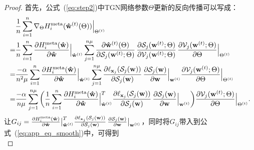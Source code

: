 \begin{proof}
首先，公式~(\ref{eq:step2})中TGN网络参数$\Theta$更新的反向传播可以写成：
\begin{equation}
\begin{aligned}
\label{eq:app_eq_smooth}
     &   \frac{1}{n} \sum\limits_{i=1}^{n} \nabla_{\Theta} H_i^{\rm meta}(\mathbf{\hat w}^{(t)}(\Theta)) \Big{|}_{\Theta^{(t)}} \\
     = & \frac{1}{n} \sum\limits_{i=1}^{n} \frac{\partial H_i^{\rm meta}(\mathbf{\hat w})}{\partial {\mathbf{\hat  w}}} \Big{|}_{\mathbf{\hat  w}^{(t)}} \sum\limits_{j=1}^{n\mu}
     \frac{\partial \mathbf{\hat w}^{(t)}(\Theta)}
            {\partial \mathcal{S}_j(\mathbf{w}^{(t)}; \Theta)} \,
     \frac{\partial \mathcal{S}_j(\mathbf{w}^{(t)}; \Theta)}
            {\partial \mathcal{V}_j(\mathbf{w}^{(t)}; \Theta)} \,
     \frac{\partial \mathcal{V}_j(\mathbf{w}^{(t)}; \Theta)}{\partial \Theta} \Big{|}_{\Theta^{(t)}} \\
     = & \frac{-\alpha}{n^2\mu} \sum\limits_{i=1}^{n} \frac{\partial H_i^{\rm meta}(\mathbf{\hat w})}{\partial {\mathbf{\hat  w}}} \Big{|}_{\mathbf{\hat  w}^{(t)}}  \sum\limits_{j=1}^{n\mu} \frac{\partial \ell_{\mathbf{x}_j}(\mathcal{S}_j(\mathbf{w}))}{\partial \mathcal{S}_j(\mathbf{w})} \, \frac{\partial \mathcal{S}_j(\mathbf{w})}{\partial \mathbf{w}}
     \Big{|}_{\mathbf{w}^{(t)}}
     \frac{\partial \mathcal{V}_j(\mathbf{w}^{(t)}; \Theta)}{\partial \Theta} \Big{|}_{\Theta^{(t)}} \\
     = & \frac{- \alpha}{n\mu} \sum\limits_{j=1}^{n\mu} 
     \bigg{(}
     \frac{1}{n} \sum\limits_{i=1}^{n} \frac{\partial H_i^{\rm meta}(\mathbf{\hat w})}{\partial {\mathbf{\hat  w}}} \Big{|}_{\mathbf{\hat  w}^{(t)}}^T \frac{\partial \ell_{\mathbf{x}_j}(\mathcal{S}_j(\mathbf{w}))}{\partial \mathcal{S}_j(\mathbf{w})} \, \frac{\partial \mathcal{S}_j(\mathbf{w})}{\partial \mathbf{w}} \Big{|}_{\mathbf{w}^{(t)}}
     \bigg{)} \frac{\partial \mathcal{V}_j(\mathbf{w}^{(t)}; \Theta)}{\partial \Theta} \Big{|}_{\Theta^{(t)}}.
\end{aligned}
\end{equation}
让$G_{ij} = \frac{\partial H_i^{\rm meta}(\mathbf{\hat w})}{\partial {\mathbf{\hat  w}}} \big{|}_{\mathbf{\hat  w}^{(t)}}^T \frac{\partial \ell_{\mathbf{x}_j}(\mathcal{S}_j(\mathbf{w}))}{\partial \mathcal{S}_j(\mathbf{w})} \, \frac{\partial \mathcal{S}_j(\mathbf{w})}{\partial \mathbf{w}} \big{|}_{\mathbf{w}^{(t)}}$，同时将$G_{ij}$带入到公式~(\ref{eq:app_eq_smooth})中，可得到
\begin{equation}

\end{equation}
\end{proof}

